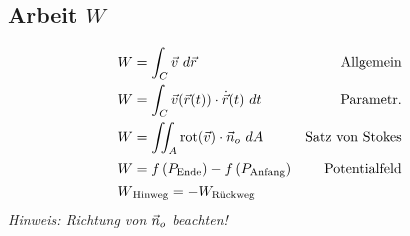 \subsection{Arbeit \texorpdfstring{\hfill $W$}{W}}
    \vspace{-1em}
    \begin{align*}
        W &= \int_C \vec{v} \ d \vec{r} &\textrm{Allgemein}\\
        W &= \int_C \vec{v}(\vec{r}(t)) \cdot \dot{\vec{r}}(t) \ dt &\textrm{Parametr.}\\
        W &= \iint_{A} \mathrm{rot}(\vec{v}) \cdot \vec{n}_o \ dA & \textrm{Satz von Stokes}\\[0.125em]
        W &= f\left(P_{\textrm{Ende}}\right) - f\left(P_{\textrm{Anfang}}\right) &\textrm{Potentialfeld} \\[0.125em]
        W &_{\textrm{Hinweg}} = - W_{\textrm{Rückweg}}& 
    \end{align*} \vskip1pt
    \textit{Hinweis: Richtung von $\vec{n}_o$ beachten!}
    
\columnbreak


